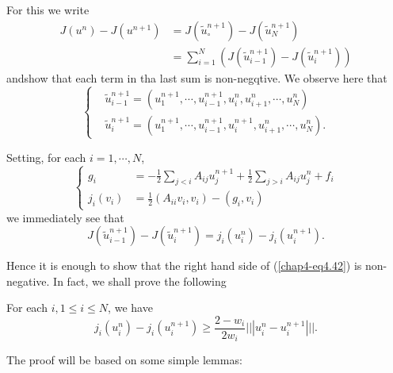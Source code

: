 \medskip
{} For this we write
\begin{align*}
J(u^{n}) - J(u^{n+1}) & = J(\widetilde{u}_{\circ}^{n+1}) - J(\widetilde{u}_{N}^{n+1})\tag{4.39}\label{chap4-eq4.39}\\
& = \sum_{i=1}^{N} (J(\widetilde{u}_{i-1}^{n+1}) - J(\widetilde{u}_{i}^{n+1}))
\end{align*}
and\pageoriginale show that each term in tha last sum is non-negqtive. We observe here that
\begin{equation*}
\begin{cases}
& \widetilde{u}_{i-1}^{n+1} = (u_{1}^{n+1}, \cdots, u_{i-1}^{n+1}, u_{i}^{n}, u_{i+1}^{n}, \cdots , u_{N}^{n})\\
& \widetilde{u}_{i}^{n+1} = (u_{1}^{n+1}, \cdots, u_{i-1}^{n+1}, u_{i}^{n+1}, u_{i+1}^{n}, \cdots, u_{N}^{n}).\tag{4.40} \label{chap4-eq4.40}
\end{cases}
\end{equation*}

Setting, for each $i = 1, \cdots, N$,
\begin{equation*}
\begin{cases}
g_{i} & = -\frac{1}{2} \sum\limits_{j < i} A_{ij} u_{j}^{n+1} + \frac{1}{2} \sum\limits_{j > i} A_{ij} u_{j}^{n} + f_{i}\\
j_{i} (v_{i}) & = \frac{1}{2} (A_{ii} v_{i}, v_{i}) - (g_{i}, v_{i})\tag{4.41}\label{chap4-eq4.41}
\end{cases}
\end{equation*}
we immediately see that
\begin{equation*}
J(\widetilde{u}_{i-1}^{n+1}) - J(\widetilde{u}_{i}^{n+1}) = j_{i}(u_{i}^{n}) - j_{i} (u_{i}^{n+1}). \tag{4.42} \label{chap4-eq4.42}
\end{equation*}

Hence it is enough to show that the right hand side of (\ref{chap4-eq4.42}) is non-negative. In fact, we shall prove the following

\begin{proposition}\label{chap4-prop4.1}
For each $i, 1 \leq i \leq N$, we have
\begin{equation*}
j_{i} (u_{i}^{n}) - j_{i} (u_{i}^{n+1}) \geq \dfrac{2-w_{i}}{2w_{i}} ||| u_{i}^{n} - u_{i}^{n+1} |||. \tag{4.43}\label{chap4-eq4.43}
\end{equation*}
\end{proposition}

The proof will be based on some simple lemmas:


